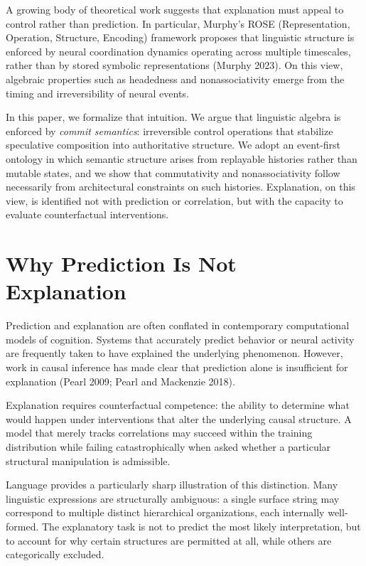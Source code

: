 \documentclass[11pt]{article}
\begin{document}
A growing body of theoretical work suggests that explanation must appeal to control rather than prediction. In particular, Murphy’s ROSE (Representation, Operation, Structure, Encoding) framework proposes that linguistic structure is enforced by neural coordination dynamics operating across multiple timescales, rather than by stored symbolic representations (Murphy 2023). On this view, algebraic properties such as headedness and nonassociativity emerge from the timing and irreversibility of neural events.

In this paper, we formalize that intuition. We argue that linguistic algebra is enforced by \emph{commit semantics}: irreversible control operations that stabilize speculative composition into authoritative structure. We adopt an event-first ontology in which semantic structure arises from replayable histories rather than mutable states, and we show that commutativity and nonassociativity follow necessarily from architectural constraints on such histories. Explanation, on this view, is identified not with prediction or correlation, but with the capacity to evaluate counterfactual interventions.

\section{Why Prediction Is Not Explanation}

Prediction and explanation are often conflated in contemporary computational models of cognition. Systems that accurately predict behavior or neural activity are frequently taken to have explained the underlying phenomenon. However, work in causal inference has made clear that prediction alone is insufficient for explanation (Pearl 2009; Pearl and Mackenzie 2018).

Explanation requires counterfactual competence: the ability to determine what would happen under interventions that alter the underlying causal structure. A model that merely tracks correlations may succeed within the training distribution while failing catastrophically when asked whether a particular structural manipulation is admissible.

Language provides a particularly sharp illustration of this distinction. Many linguistic expressions are structurally ambiguous: a single surface string may correspond to multiple distinct hierarchical organizations, each internally well-formed. The explanatory task is not to predict the most likely interpretation, but to account for why certain structures are permitted at all, while others are categorically excluded.
\end{document}
